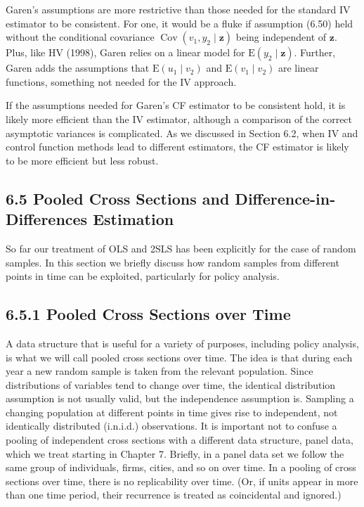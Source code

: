\documentclass[10pt]{article}
\begin{document}
Garen's assumptions are more restrictive than those needed for the standard IV estimator to be consistent. For one, it would be a fluke if assumption (6.50) held without the conditional covariance $\operatorname{Cov}\left(v_{1}, y_{2} \mid \boldsymbol{z}\right)$ being independent of $\boldsymbol{z}$. Plus, like HV (1998), Garen relies on a linear model for $\mathrm{E}\left(y_{2} \mid \boldsymbol{z}\right)$. Further, Garen adds the assumptions that $\mathrm{E}\left(u_{1} \mid v_{2}\right)$ and $\mathrm{E}\left(v_{1} \mid v_{2}\right)$ are linear functions, something not needed for the IV approach.

If the assumptions needed for Garen's CF estimator to be consistent hold, it is likely more efficient than the IV estimator, although a comparison of the correct asymptotic variances is complicated. As we discussed in Section 6.2, when IV and control function methods lead to different estimators, the CF estimator is likely to be more efficient but less robust.

\subsection*{6.5 Pooled Cross Sections and Difference-in-Differences Estimation}
So far our treatment of OLS and 2SLS has been explicitly for the case of random samples. In this section we briefly discuss how random samples from different points in time can be exploited, particularly for policy analysis.

\subsection*{6.5.1 Pooled Cross Sections over Time}
A data structure that is useful for a variety of purposes, including policy analysis, is what we will call pooled cross sections over time. The idea is that during each year a new random sample is taken from the relevant population. Since distributions of variables tend to change over time, the identical distribution assumption is not usually valid, but the independence assumption is. Sampling a changing population at different points in time gives rise to independent, not identically distributed (i.n.i.d.) observations. It is important not to confuse a pooling of independent cross sections with a different data structure, panel data, which we treat starting in Chapter 7. Briefly, in a panel data set we follow the same group of individuals, firms, cities, and so on over time. In a pooling of cross sections over time, there is no replicability over time. (Or, if units appear in more than one time period, their recurrence is treated as coincidental and ignored.)
\end{document}

